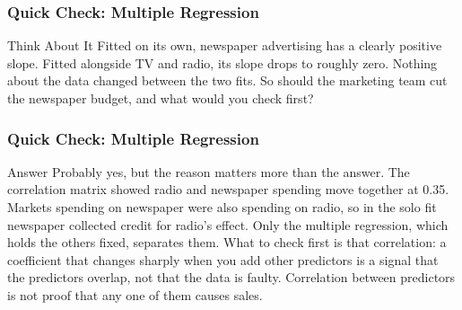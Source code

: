 \begin{frame}[fragile]\frametitle{Quick Check: Multiple Regression}
\begin{block}{Think About It}
Fitted on its own, newspaper advertising has a clearly positive slope. Fitted alongside TV and radio, its slope drops to roughly zero. Nothing about the data changed between the two fits. So should the marketing team cut the newspaper budget, and what would you check first?
\end{block}
\end{frame}

\begin{frame}[fragile]\frametitle{Quick Check: Multiple Regression}
\begin{block}{Answer}
Probably yes, but the reason matters more than the answer. The correlation matrix showed radio and newspaper spending move together at 0.35. Markets spending on newspaper were also spending on radio, so in the solo fit newspaper collected credit for radio's effect. Only the multiple regression, which holds the others fixed, separates them. What to check first is that correlation: a coefficient that changes sharply when you add other predictors is a signal that the predictors overlap, not that the data is faulty. Correlation between predictors is not proof that any one of them causes sales.
\end{block}
\end{frame}


